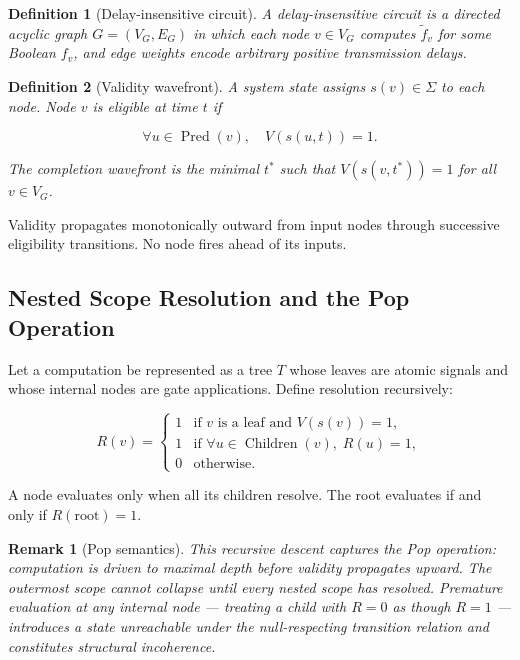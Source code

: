\documentclass[11pt]{article}
\newtheorem{definition}{Definition}
\newtheorem{remark}{Remark}
\theoremstyle{remark}
\begin{document}
\begin{definition}[Delay-insensitive circuit]
A delay-insensitive circuit is a directed acyclic graph $G = (V_G, E_G)$ in which each node $v \in V_G$ computes $\tilde{f}_v$ for some Boolean $f_v$, and edge weights encode arbitrary positive transmission delays.
\end{definition}

\begin{definition}[Validity wavefront]
A system state assigns $s(v) \in \Sigma$ to each node. Node $v$ is \emph{eligible} at time $t$ if

\[
\forall u \in \operatorname{Pred}(v),\quad V(s(u,t)) = 1.
\]

The \emph{completion wavefront} is the minimal $t^*$ such that $V(s(v, t^*)) = 1$ for all $v \in V_G$.
\end{definition}

Validity propagates monotonically outward from input nodes through successive eligibility transitions. No node fires ahead of its inputs.

\subsection{Nested Scope Resolution and the Pop Operation}

Let a computation be represented as a tree $T$ whose leaves are atomic signals and whose internal nodes are gate applications. Define resolution recursively:

\[
R(v) = \begin{cases} 1 & \text{if } v \text{ is a leaf and } V(s(v)) = 1, \\ 1 & \text{if } \forall u \in \operatorname{Children}(v),\; R(u) = 1, \\ 0 & \text{otherwise.} \end{cases}
\]

A node evaluates only when all its children resolve. The root evaluates if and only if $R(\text{root}) = 1$.

\begin{remark}[Pop semantics]
This recursive descent captures the Pop operation: computation is driven to maximal depth before validity propagates upward. The outermost scope cannot collapse until every nested scope has resolved. Premature evaluation at any internal node --- treating a child with $R = 0$ as though $R = 1$ --- introduces a state unreachable under the null-respecting transition relation and constitutes structural incoherence.
\end{remark}
\end{document}
